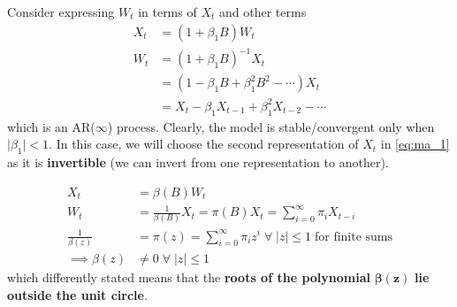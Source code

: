 \documentclass[../../time_series_notes.tex]{subfiles}
\begin{document}
Consider expressing $W_{t}$ in terms of $X_{t}$ and other terms
\begin{align*}
    X_{t} &= (1 + \beta_{1}B)W_{t}\\
    W_{t} &= (1 + \beta_{1}B)^{-1}X_{t}\\
    &= (1 - \beta_{1}B + \beta_{1}^{2}B^{2} - \cdots)X_{t}\\
    &= X_{t} - \beta_{1}X_{t-1} + \beta_{1}^{2}X_{t-2} - \cdots
\end{align*}
which is an AR($\infty$) process. Clearly, the model is stable/convergent only when $\lvert \beta_{1} \rvert < 1$. In this case, we will choose the second representation of $X_{t}$ in \eqref{eq:ma_1} as it is \textbf{invertible} (we can invert from one representation to another).

\begin{align*}
    X_{t} &= \beta(B)W_{t}\\
    W_{t} &= \frac{1}{\beta(B)}X_{t} = \pi(B)X_{t} = \sum_{i=0}^{\infty} \pi_{i}X_{t-i}\\
     \frac{1}{\beta(z)} &= \pi(z) = \sum_{i=0}^{\infty} \pi_{i}z^{i} \; \forall \; \lvert z \rvert \leq 1 \; \text{for finite sums}\\
     \implies \beta(z) &\neq 0 \; \forall \; \lvert z \rvert \leq 1
\end{align*}
which differently stated means that the \textbf{roots of the polynomial }$\bm{\beta(z)}$\textbf{ lie outside the unit circle}.
\end{document}
